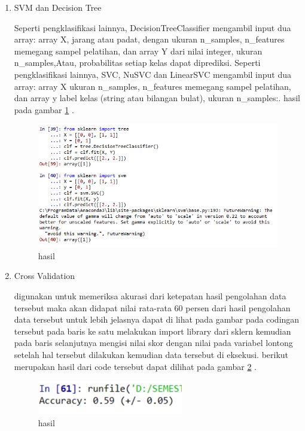 \begin{enumerate}
\item SVM dan Decision Tree\par
Seperti pengklasifikasi lainnya, DecisionTreeClassifier mengambil input dua array: array X, jarang atau padat, dengan ukuran n\_samples, n\_features memegang sampel pelatihan, dan array Y dari nilai integer, ukuran n\_samples,Atau, probabilitas setiap kelas dapat diprediksi. Seperti pengklasifikasi lainnya, SVC, NuSVC dan LinearSVC mengambil input dua array: array X ukuran n\_samples, n\_features memegang sampel pelatihan, dan array y label kelas (string atau bilangan bulat), ukuran n\_samples:. hasil pada gambar \ref{contoh6} .

\begin{figure}[ht]
\centering
\includegraphics[scale=1]{figures/1174057/chapter3/10.PNG}
\caption{hasil}
\label{contoh6}
\end{figure}

\item Cross Validation\par
 digunakan untuk memeriksa akurasi dari ketepatan hasil pengolahan data tersebut maka akan didapat nilai rata-rata 60 persen dari hasil pengolahan data tersebut untuk lebih jelasnya dapat di lihat pada gambar pada codingan tersebut pada baris ke satu melakukan import library dari sklern kemudian pada baris selanjutnya mengisi nilai skor dengan nilai pada variabel lontong setelah hal tersebut dilakukan kemudian data tersebut di eksekusi. berikut merupakan hasil dari code tersebut dapat dilihat pada gambar \ref{contoh7} .

\begin{figure}[ht]
\centering
\includegraphics[scale=1]{figures/1174057/chapter3/11.PNG}
\caption{hasil}
\label{contoh7}
\end{figure}


\end{enumerate}
